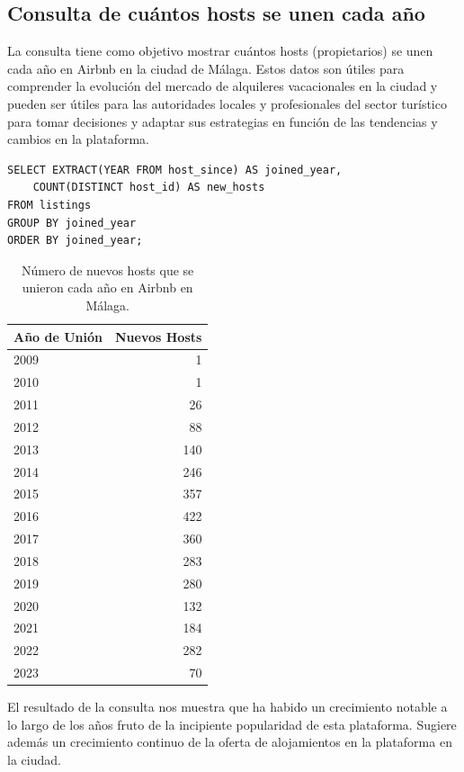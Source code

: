 \subsection{Consulta de cuántos hosts se unen cada año}
La consulta tiene como objetivo mostrar cuántos hosts (propietarios) se unen cada año en Airbnb en la ciudad de Málaga. Estos datos son útiles para comprender la evolución del mercado de alquileres vacacionales en la ciudad y pueden ser útiles para las autoridades locales y profesionales del sector turístico para tomar decisiones y adaptar sus estrategias en función de las tendencias y cambios en la plataforma.
\begin{verbatim}
SELECT EXTRACT(YEAR FROM host_since) AS joined_year, 
    COUNT(DISTINCT host_id) AS new_hosts
FROM listings
GROUP BY joined_year
ORDER BY joined_year;
\end{verbatim}
\begin{table}[h]
\centering
\begin{tabular}{|l|r|}
\hline
\textbf{Año de Unión} & \textbf{Nuevos Hosts} \\
\hline
2009 & 1 \\ \hline
2010 & 1 \\ \hline
2011 & 26 \\ \hline
2012 & 88 \\ \hline
2013 & 140 \\ \hline
2014 & 246 \\ \hline
2015 & 357 \\ \hline
2016 & 422 \\ \hline
2017 & 360 \\ \hline
2018 & 283 \\ \hline
2019 & 280 \\ \hline
2020 & 132 \\ \hline
2021 & 184 \\ \hline
2022 & 282 \\ \hline
2023 & 70 \\ \hline
\end{tabular}
\caption{Número de nuevos hosts que se unieron cada año en Airbnb en Málaga.}
\end{table}

El resultado de la consulta nos muestra que ha habido un crecimiento notable a lo largo de los años fruto de la incipiente popularidad de esta plataforma. Sugiere además un crecimiento continuo de la oferta de alojamientos en la plataforma en la ciudad.

